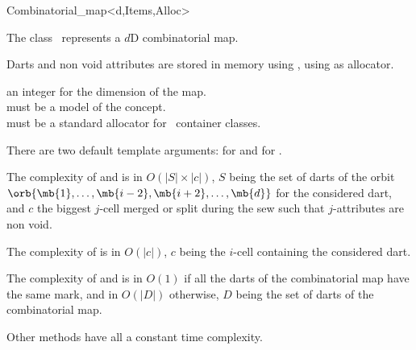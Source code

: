 \ccRefPageBegin

\begin{ccRefClass}{Combinatorial_map<d,Items,Alloc>}


\ccDefinition
  
The class \ccRefName\ represents a $d$D combinatorial map.

Darts and non void attributes are stored in memory using
, using  as allocator.

\ccIsModel
{}

\ccParameters
{} an integer for the dimension of the map.\\
 must be a model of the  concept. \\
 must be a standard allocator for \stl\ container classes.

There are two default template arguments:
 for  and
 for .

\ccTypes
{}
\ccGlue
{}


The complexity of  and  is in $O(|S|\times |c|)$, $S$
being the set of darts of the orbit
$\orb{\mb{1},\ldots,\mb{i-2},\mb{i+2},\ldots,\mb{d}}$ for the
considered dart, and $c$ the biggest $j$-cell merged or
split during the sew such that $j$-attributes are non void.


The complexity of  is in $O(|c|)$, $c$ being the
$i$-cell containing the considered dart.

The complexity of  and  is in $O(1)$ if
all the darts of the combinatorial map have the same mark, and in
$O(|D|)$ otherwise, $D$ being the set of darts of the combinatorial
map.

Other methods have all a constant time complexity.

\ccSeeAlso
{}\\
\\

\end{ccRefClass}
\ccRefPageEnd

